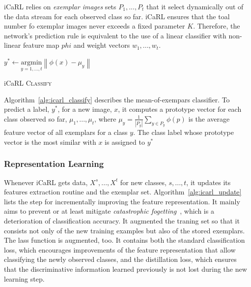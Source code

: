 iCaRL relies on \textit{exemplar images} sets $P_1, ..., P_t$ that it select dynamically out of the data stream for each observed class so far. iCaRL ensures that the toal number fo exemplar images never exceeds a fixed parameter $K$. Therefore, the network's prediction rule is equivalent to the use of a linear classifier with non-linear feature map $phi$ and weight vectors $w_1, ..., w_t$.

\begin{algorithm}[ht]
  $y^{*} \leftarrow \underset{y = 1, ..., t}{\textrm{argmin}} \left\| \phi(x) - \mu_y \right\|$  \\
  
\caption{ iCaRL \textsc{Classify} \label{alg:icarl_classify}}
\end{algorithm}

Algorithm~\ref{alg:icarl_classify} describes the mean-of-exempars classifier. To predict a label, $y^*$, for a new image, $x$, it computes a prototype vector for each class observed so far, $\mu_1, ..., \mu_t$, where $\mu_y = \frac{1}{\left| P_y \right|} \sum_{y \in P_y} \phi\left( p \right)$ is the average feature vector of all exemplars for a class $y$. The class label whose prototype vector is the most similar with $x$ is assigned to $y^*$

\subsubsection{Representation Learning}
\label{sec:icarl_learning}

Whenever iCaRL gets data, $X^s, ..., X^t$ for new classes, $s, ..., t$, it updates its features extraction routine and the exemplar set. Algorithm~\ref{alg:icarl_update} lists the step for incrementally improving the feature representation. It mainly aims to prevent or at least mitigate \textit{catastrophic fogetting}~\cite{McCloskey:1989aa}, which is a deterioration of classification accuracy. It augmented the traning set so that it consists not only of the new training examples but also of the stored exemplars. The lass function is augmented, too. It contains both the standard classification loss, which encourages improvements of the feature representation that allow classifying the newly observed classes, and the distillation loss, which ensures that the discriminative information learned previously is not lost during the new learning step.

